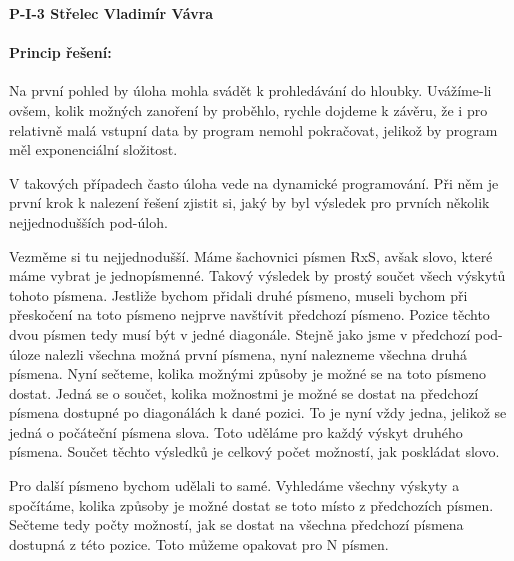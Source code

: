 \documentclass[a4paper,12pt]{article}
\def\author{Vladimír Vávra}
\begin{document}
\pagestyle{plain}
\noindent
\textbf{P-I-3 Střelec \hfill \author}
\vspace{0.5cm}

\paragraph{Princip řešení:}
Na první pohled by úloha mohla svádět k prohledávání do hloubky. Uvážíme-li ovšem, kolik možných zanoření by proběhlo, rychle dojdeme k závěru, že i pro relativně malá vstupní data by program nemohl pokračovat, jelikož by program měl exponenciální složitost. 

V takových případech často úloha vede na dynamické programování. Při něm je první krok k nalezení řešení zjistit si, jaký by byl výsledek pro prvních několik nejjednodušších pod-úloh. 

Vezměme si tu nejjednodušší. Máme šachovnici písmen RxS, avšak slovo, které máme vybrat je jednopísmenné. Takový výsledek by prostý součet všech výskytů tohoto písmena. Jestliže bychom přidali druhé písmeno, museli bychom při přeskočení na toto písmeno nejprve navštívit předchozí písmeno. Pozice těchto dvou písmen tedy musí být v jedné diagonále. Stejně jako jsme v předchozí pod-úloze nalezli všechna možná první písmena, nyní nalezneme všechna druhá písmena. Nyní sečteme, kolika možnými způsoby je možné se na toto písmeno dostat. Jedná se o součet, kolika možnostmi je možné se dostat na předchozí písmena dostupné po diagonálách k dané pozici. To je nyní vždy jedna, jelikož se jedná o počáteční písmena slova. Toto uděláme pro každý výskyt druhého písmena. Součet těchto výsledků je celkový počet možností, jak poskládat slovo. 

Pro další písmeno bychom udělali to samé. Vyhledáme všechny výskyty a spočítáme, kolika způsoby je možné dostat se toto místo z předchozích písmen. Sečteme tedy počty možností, jak se dostat na všechna předchozí písmena dostupná z této pozice. Toto můžeme opakovat pro N písmen.
\end{document}

